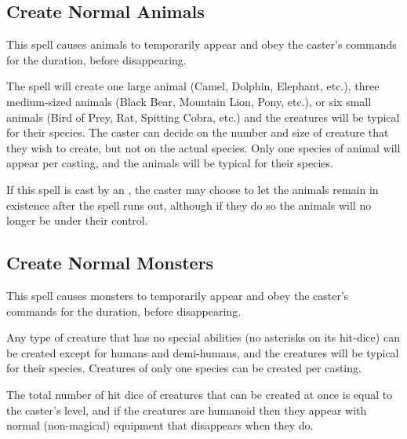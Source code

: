 \begin{multicols*}{2}
\subsection{Create Normal Animals}\label{spell:Create Normal Animals}

This spell causes animals to temporarily appear and obey the caster’s commands for the duration, before disappearing.

The spell will create one large animal (Camel, Dolphin, Elephant, etc.), three medium-sized animals (Black Bear, Mountain Lion, Pony, etc.), or six small animals (Bird of Prey, Rat, Spitting Cobra, etc.) and the creatures will be typical for their species. The caster can decide on the number and size of creature that they wish to create, but not on the actual species. Only one species of animal will appear per casting, and the animals will be typical for their species.

If this spell is cast by an , the caster may choose to let the animals remain in existence after the spell runs out, although if they do so the animals will no longer be under their control.

\subsection{Create Normal Monsters}\label{spell:Create Normal Monsters}

This spell causes monsters to temporarily appear and obey the caster’s commands for the duration, before disappearing.

Any type of creature that has no special abilities (no asterisks on its hit-dice) can be created except for humans and demi-humans, and the creatures will be typical for their species. Creatures of only one species can be created per casting.

The total number of hit dice of creatures that can be created at once is equal to the caster’s level, and if the creatures are humanoid then they appear with normal (non-magical) equipment that disappears when they do.


\end{multicols*}

